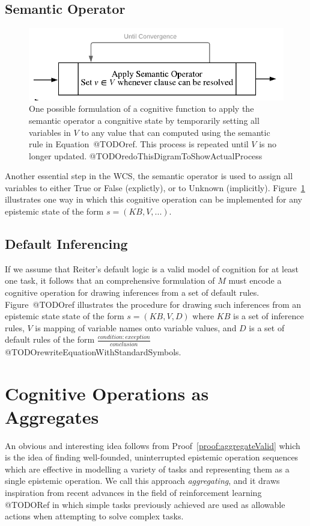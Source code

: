 \documentclass[
11pt, %
english, %
singlespacing, %
headsepline, %
]{MastersDoctoralThesis} %
\begin{document}
\subsection{Semantic Operator}
\begin{figure} 
\begin{center}
\includegraphics[width=\linewidth]{semanticOperatorSCP}
\end{center}
\caption{One possible formulation of a cognitive function to apply the semantic operator a congnitive state by temporarily setting all variables in $V$ to any value that can computed using the semantic rule in Equation~@TODOref. This process is repeated until $V$ is no longer updated. @TODOredoThisDigramToShowActualProcess}
\label{fig:semanticOperatorSCP}
\end{figure}

Another essential step in the WCS, the semantic operator is used to assign all variables to either True or False (explictly), or to Unknown (implicitly). Figure~\ref{fig:semanticOperatorSCP} illustrates one way in which this cognitive operation can be implemented for any epistemic state of the form $s=(KB,V,...)$.



\subsection{Default Inferencing}
If we assume that Reiter's default logic is a valid model of cognition for at least one task, it follows that an comprehensive formulation of $M$ must encode a cognitive operation for drawing inferences from a set of default rules. Figure~@TODOref illustrates the procedure for drawing such inferences from an epistemic state state of the form $s=(KB,V,D)$ where $KB$ is a set of inference rules, $V$ is mapping of variable names onto variable values, and $D$ is a set of default rules of the form $\frac{condition:exception}{conclusion}$ @TODOrewriteEquationWithStandardSymbols.

\section{Cognitive Operations as Aggregates}
An obvious and interesting idea follows from Proof~\ref{proof:aggregateValid} which is the idea of finding well-founded, uninterrupted epistemic operation sequences which are effective in modelling a variety of tasks and representing them as a single epistemic operation. We call this approach \textit{aggregating}, and it draws inspiration from recent advances in the field of reinforcement learning @TODORef in which simple tasks previously achieved are used as allowable actions when attempting to solve complex tasks.
\end{document}
